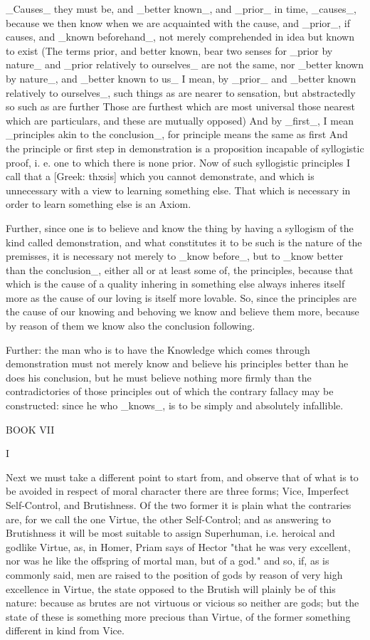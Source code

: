 _Causes_ they must be, and _better known_, and _prior_ in time,
_causes_, because we then know when we are acquainted with the cause,
and _prior_, if causes, and _known beforehand_, not merely comprehended
in idea but known to exist (The terms prior, and better known, bear two
senses for _prior by nature_ and _prior relatively to ourselves_ are not
the same, nor _better known by nature_, and _better known to us_ I mean,
by _prior_ and _better known relatively to ourselves_, such things as
are nearer to sensation, but abstractedly so such as are further
Those are furthest which are most universal those nearest which are
particulars, and these are mutually opposed) And by _first_, I mean
_principles akin to the conclusion_, for principle means the same as
first And the principle or first step in demonstration is a proposition
incapable of syllogistic proof, i. e. one to which there is none prior.
Now of such syllogistic principles I call that a [Greek: thxsis] which
you cannot demonstrate, and which is unnecessary with a view to learning
something else. That which is necessary in order to learn something else
is an Axiom.

Further, since one is to believe and know the thing by having a
syllogism of the kind called demonstration, and what constitutes it to
be such is the nature of the premisses, it is necessary not merely to
_know before_, but to _know better than the conclusion_, either all or
at least some of, the principles, because that which is the cause of a
quality inhering in something else always inheres itself more as the
cause of our loving is itself more lovable. So, since the principles are
the cause of our knowing and behoving we know and believe them more,
because by reason of them we know also the conclusion following.

Further: the man who is to have the Knowledge which comes through
demonstration must not merely know and believe his principles better
than he does his conclusion, but he must believe nothing more firmly
than the contradictories of those principles out of which the contrary
fallacy may be constructed: since he who _knows_, is to be simply and
absolutely infallible.




BOOK VII



I

Next we must take a different point to start from, and observe that of
what is to be avoided in respect of moral character there are three
forms; Vice, Imperfect Self-Control, and Brutishness. Of the two former
it is plain what the contraries are, for we call the one Virtue, the
other Self-Control; and as answering to Brutishness it will be most
suitable to assign Superhuman, i.e. heroical and godlike Virtue, as, in
Homer, Priam says of Hector "that he was very excellent, nor was he like
the offspring of mortal man, but of a god." and so, if, as is commonly
said, men are raised to the position of gods by reason of very high
excellence in Virtue, the state opposed to the Brutish will plainly be
of this nature: because as brutes are not virtuous or vicious so neither
are gods; but the state of these is something more precious than Virtue,
of the former something different in kind from Vice.

